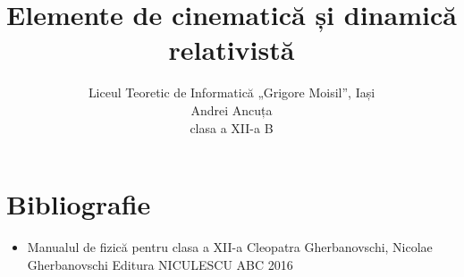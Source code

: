 \documentclass[a4paper, 12pt]{article}
\title{Elemente de cinematică și dinamică relativistă}
\author{Liceul Teoretic de Informatică „Grigore Moisil”, Iași \\ Andrei Ancuța \\
clasa a XII-a B}
\def\\{}%
\newcommand{\mktitle}{%
    \noindent
    {\small\theauthor}

    \begin{center}
        \LARGE\thetitle
    \end{center}
}
\begin{document}
\mktitle
\tableofcontents




\clearpage


\clearpage

\section*{Bibliografie}
\begin{itemize}
    \item Manualul de fizică pentru clasa a XII-a \\
        Cleopatra Gherbanovschi, Nicolae Gherbanovschi \\
        Editura NICULESCU ABC \\
        2016
\end{itemize}
\end{document}
